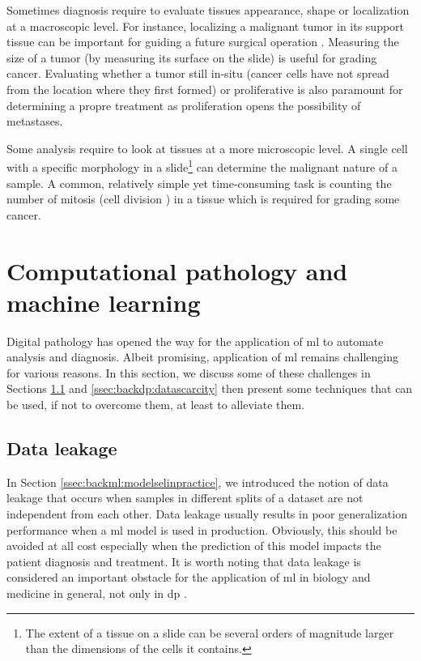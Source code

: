 Sometimes diagnosis require to evaluate tissues appearance, shape or localization at a macroscopic level. For instance, localizing a malignant tumor in its support tissue can be important for guiding a future surgical operation . Measuring the size of a tumor (by measuring its surface on the slide) is useful for grading cancer. Evaluating whether a tumor still in-situ (\ie cancer cells have not spread from the location where they first formed) or proliferative is also paramount for determining a propre treatment as proliferation opens the possibility of metastases.  

Some analysis require to look at tissues at a more microscopic level. A single cell with a specific morphology in a slide\footnote{The extent of a tissue on a slide can be several orders of magnitude larger than the dimensions of the cells it contains.} can determine the malignant nature of a sample. A common, relatively simple yet time-consuming task is counting the number of mitosis (\ie cell division ) in a tissue which is required for grading some cancer.




\section{Computational pathology and machine learning}
\label{sec:backdp:ml}

Digital pathology has opened the way for the application of \acrlong{ml} to automate analysis and diagnosis. Albeit promising, application of \acrlong{ml} remains challenging for various reasons. In this section, we discuss some of these challenges in Sections \ref{ssec:backdp:dataleakage} and \ref{ssec:backdp:datascarcity} then present some techniques that can be used, if not to overcome them, at least to alleviate them.

\subsection{Data leakage}
\label{ssec:backdp:dataleakage}

In Section \ref{ssec:backml:modelselinpractice}, we introduced the notion of data leakage that occurs when samples in different splits of a dataset are not independent from each other. Data leakage usually results in poor generalization performance when a \acrlong{ml} model is used in production. Obviously, this should be avoided at all cost especially when the prediction of this model impacts the patient diagnosis and treatment. It is worth noting that data leakage is considered an important obstacle for the application of \acrlong{ml} in biology and medicine in general, not only in \acrlong{dp} \parencite{ching2018opportunities}. 

